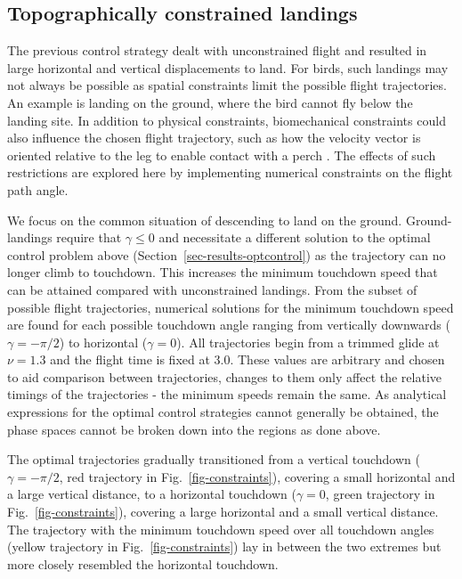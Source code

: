\subsection{Topographically constrained landings} \label{sec-results-constraints}

The previous control strategy dealt with unconstrained flight and resulted in large horizontal and vertical displacements to land. For birds, such landings may not always be possible as spatial constraints limit the possible flight trajectories. An example is landing on the ground, where the bird cannot fly below the landing site. In addition to physical constraints, biomechanical constraints could also influence the chosen flight trajectory, such as how the velocity vector is oriented relative to the leg to enable contact with a perch \cite{roderickBirdinspiredDynamicGrasping2021}. The effects of such restrictions are explored here by implementing numerical constraints on the flight path angle.

We focus on the common situation of descending to land on the ground. Ground-landings require that $\gamma \leq 0$ and necessitate a different solution to the optimal control problem above (Section~\ref{sec-results-optcontrol}) as the trajectory can no longer climb to touchdown. This increases the minimum touchdown speed that can be attained compared with unconstrained landings. From the subset of possible flight trajectories, numerical solutions for the minimum touchdown speed are found for each possible touchdown angle ranging from vertically downwards ($\gamma=-\pi/2$) to horizontal ($\gamma=0$). All trajectories begin from a trimmed glide at $\nu=1.3$ and the flight time is fixed at 3.0. These values are arbitrary and chosen to aid comparison between trajectories, changes to them only affect the relative timings of the trajectories - the minimum speeds remain the same. As analytical expressions for the optimal control strategies cannot generally be obtained, the phase spaces cannot be broken down into the regions as done above.

The optimal trajectories gradually transitioned from a vertical touchdown ($\gamma=-\pi/2$, red trajectory in Fig.~\ref{fig-constraints}), covering a small horizontal and a large vertical distance, to a horizontal touchdown ($\gamma=0$, green trajectory in Fig.~\ref{fig-constraints}), covering a large horizontal and a small vertical distance. The trajectory with the minimum touchdown speed over all touchdown angles (yellow trajectory in Fig.~\ref{fig-constraints}) lay in between the two extremes but more closely resembled the horizontal touchdown.

